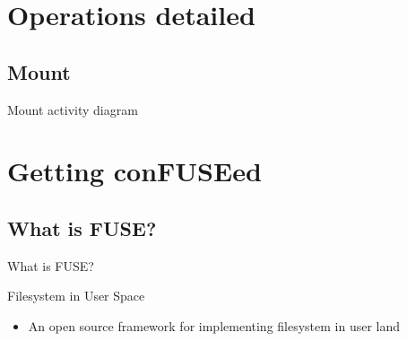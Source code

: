 \documentclass{beamer}
\begin{document}
\section{Operations detailed}

\subsection{Mount}

\begin{frame}{Mount activity diagram}
	
	
\end{frame}


\section{Getting conFUSEed}

\subsection{What is FUSE?}

\begin{frame}{What is FUSE?}

	\begin{block}{Filesystem in User Space}

		\begin{itemize}[<+->]

			\item{An open source framework for implementing filesystem in user land}\footnotemark[1]
	
		\end{itemize}

	\end{block}


\end{frame}
\end{document}
